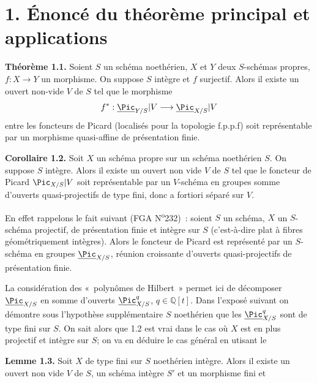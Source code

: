 \section*{1. Énoncé du théorème principal et applications}

\textbf{Théorème 1.1.} Soient \(S\) un schéma noethérien, \(X\) et \(Y\) deux \(S\)-schémas propres, \(f:X\to Y\) un morphisme. On suppose \(S\) intègre et \(f\) surjectif. Alors il existe un ouvert non-vide \(V\) de \(S\) tel que le morphisme
\[
  f^*:\underline{\Pic}_{Y/S}|V\longrightarrow \underline{\Pic}_{X/S}|V
\]
entre les foncteurs de Picard (localisés pour la topologie f.p.p.f) soit représentable par un morphisme quasi-affine de présentation finie.

\textbf{Corollaire 1.2.} Soit \(X\) un schéma propre sur un schéma noethérien \(S\). On suppose \(S\) intègre. Alors il existe un ouvert non vide \(V\) de \(S\) tel que le foncteur de Picard \(\Pic_{X/S}|V\) soit représentable par un \(V\)-schéma en groupes somme d'ouverts quasi-projectifs de type fini, donc a fortiori séparé sur \(V\).

En effet rappelons le fait suivant (FGA N\textsuperscript{o}232)~: soient \(S\) un schéma, \(X\) un \(S\)-schéma projectif, de présentation finie et intègre sur \(S\) (c'est-à-dire plat à fibres géométriquement intègres). Alors le foncteur de Picard est représenté par un \(S\)-schéma en groupes \(\underline{\Pic}_{X/S}\), réunion croissante d'ouverts quasi-projectifs de présentation finie.

La considération des «~polynômes de Hilbert~» permet ici de décomposer \(\underline{\Pic}_{X/S}\) en somme d'ouverts \(\underline{\Pic}^q_{X/S}\), \(q\in\mathbb Q[t]\). Dans l'exposé suivant on démontre sous l'hypothèse supplémentaire \(S\) noethérien que les \(\underline{\Pic}^q_{X/S}\) sont de type fini sur \(S\). On sait alors que 1.2 est vrai dans le cas où \(X\) est en plus projectif et intègre sur \(S\); on va en déduire le cas général en utisant le

\textbf{Lemme 1.3.} Soit \(X\) de type fini sur \(S\) noethérien intègre. Alors il existe un ouvert non vide \(V\) de \(S\), un schéma intègre \(S'\) et un morphisme fini et
